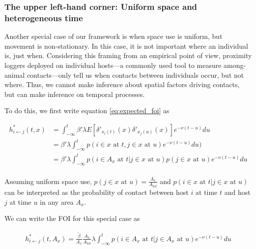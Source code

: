 \documentclass[letterpaper]{article}
\begin{document}
\subsubsection*{The upper left-hand corner: Uniform space and heterogeneous time}

Another special case of our framework is when space use is uniform, but movement is non-stationary.  In this case, it is not important where an individual is, just when. Considering this framing from an empirical point of view, proximity loggers deployed on individual hosts---a commonly used tool to measure among-animal contacts---only tell us when contacts between individuals occur, but not where.  Thus, we cannot make inference about spatial factors driving contacts, but can make inference on temporal processes. 


To do this, we first write equation \ref{eq:expected_foi} as 

\begin{equation}
    \begin{aligned}
    h^*_{i \leftarrow j}(t, x) &= \int_{-\infty}^{t} \beta' \lambda E[\delta'_{x_i(t)}(x) \delta'_{x_j(u)}(x)] e^{-\nu(t - u)} du \\
    &= \beta' \lambda \int_{-\infty}^{t} p(i \in x \text{ at } t, j \in x \text{ at } u) e^{-\nu(t - u)} du) \\
    &= \beta' \lambda \int_{-\infty}^{t} p(i \in A_x \text{ at } t | j \in x \text{ at } u) p(j \in x \text{ at } u) e^{-\nu(t - u)} du \\
    \end{aligned}
    \label{eq:foi_prob}
\end{equation}

Assuming uniform space use, $p(j \in x \text{ at } u) = \frac{A_x}{A_{tot}}$ and $p(i \in x \text{ at } t | j \in x \text{ at } u)$ can be interpreted as the probability of contact between host $i$ at time $t$ and host $j$ at time $u$ in any area $A_x$.

We can write the FOI for this special case as 

\begin{equation}
    \begin{aligned}
    h^*_{i \leftarrow j}(t, A_x) = \frac{\tilde{\beta}}{A_x}\frac{A_x}{A_{tot}} \lambda \int_{-\infty}^{t} p(i \in A_x \text{ at } t | j \in A_x \text{ at } u) e^{-\nu(t - u)} du \\
    \end{aligned}
    \label{eq:foi_uniform_space}
\end{equation}
\end{document}
